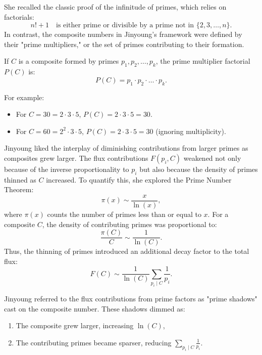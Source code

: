 She recalled the classic proof of the infinitude of primes, which relies on factorials:
\[
n! + 1 \quad \text{is either prime or divisible by a prime not in } \{2, 3, \ldots, n\}.
\]
In contrast, the composite numbers in Jinyoung’s framework were defined by their "prime multipliers," or the set of primes contributing to their formation.

If \( C \) is a composite formed by primes \( p_1, p_2, \ldots, p_k \), the prime multiplier factorial \( P(C) \) is:
\[
P(C) = p_1 \cdot p_2 \cdot \ldots \cdot p_k.
\]

For example:
\begin{itemize}
    \item For \( C = 30 = 2 \cdot 3 \cdot 5 \), \( P(C) = 2 \cdot 3 \cdot 5 = 30 \).
    \item For \( C = 60 = 2^2 \cdot 3 \cdot 5 \), \( P(C) = 2 \cdot 3 \cdot 5 = 30 \) (ignoring multiplicity).
\end{itemize}

Jinyoung liked the interplay of diminishing contributions from larger primes as composites grew larger. The flux contributions \( F(p_i, C) \) weakened not only because of the inverse proportionality to \( p_i \) but also because the density of primes thinned as \( C \) increased. To quantify this, she explored the Prime Number Theorem:
\[
\pi(x) \sim \frac{x}{\ln(x)},
\]
where \( \pi(x) \) counts the number of primes less than or equal to \( x \). For a composite \( C \), the density of contributing primes was proportional to:
\[
\frac{\pi(C)}{C} \sim \frac{1}{\ln(C)}.
\]
Thus, the thinning of primes introduced an additional decay factor to the total flux:
\[
F(C) \sim \frac{1}{\ln(C)} \sum_{p_i \mid C} \frac{1}{p_i}.
\]

Jinyoung referred to the flux contributions from prime factors as "prime shadows" cast on the composite number. These shadows dimmed as:
\begin{enumerate}
    \item The composite grew larger, increasing \( \ln(C) \),
    \item The contributing primes became sparser, reducing \( \sum_{p_i \mid C} \frac{1}{p_i} \).
\end{enumerate}



